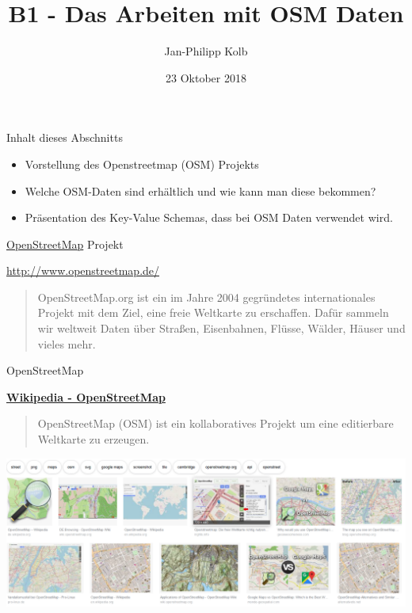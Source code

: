 \documentclass[ignorenonframetext,]{beamer}
\title{B1 - Das Arbeiten mit OSM Daten}
\author{Jan-Philipp Kolb}
\date{23 Oktober 2018}
\providecommand{\tightlist}{%
  \setlength{\itemsep}{0pt}\setlength{\parskip}{0pt}}
\begin{document}
\frame{\titlepage}

\begin{frame}{Inhalt dieses Abschnitts}
\protect\hypertarget{inhalt-dieses-abschnitts}{}

\begin{itemize}
\tightlist
\item
  Vorstellung des Openstreetmap (OSM) Projekts
\item
  Welche OSM-Daten sind erhältlich und wie kann man diese bekommen?
\item
  Präsentation des Key-Value Schemas, dass bei OSM Daten verwendet wird.
\end{itemize}

\end{frame}

\begin{frame}{\href{http://www.openstreetmap.de/}{OpenStreetMap}
Projekt}
\protect\hypertarget{openstreetmap-projekt}{}

\begin{block}{\url{http://www.openstreetmap.de/}}

\begin{quote}
OpenStreetMap.org ist ein im Jahre 2004 gegründetes internationales
Projekt mit dem Ziel, eine freie Weltkarte zu erschaffen. Dafür sammeln
wir weltweit Daten über Straßen, Eisenbahnen, Flüsse, Wälder, Häuser und
vieles mehr.
\end{quote}

\end{block}

\end{frame}

\begin{frame}{OpenStreetMap}
\protect\hypertarget{openstreetmap}{}

\begin{block}{\href{https://en.wikipedia.org/wiki/OpenStreetMap}{\textbf{Wikipedia
- OpenStreetMap}}}

\begin{quote}
OpenStreetMap (OSM) ist ein kollaboratives Projekt um eine editierbare
Weltkarte zu erzeugen.
\end{quote}

\includegraphics{figure/overview_osm.PNG}

\end{block}

\end{frame}
\end{document}
